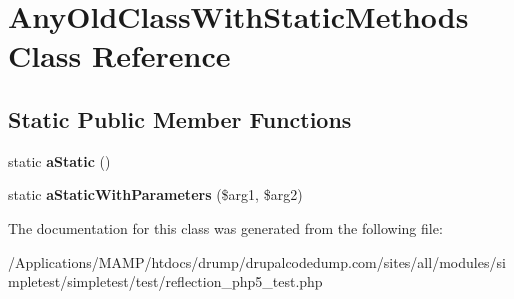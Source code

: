 \hypertarget{class_any_old_class_with_static_methods}{
\section{AnyOldClassWithStaticMethods Class Reference}
\label{class_any_old_class_with_static_methods}
}
\subsection*{Static Public Member Functions}
\begin{DoxyCompactItemize}
\item 
\hypertarget{class_any_old_class_with_static_methods_abeea0e82e5cc85bf5c6577df7d784172}{
static {\bfseries aStatic} ()}
\label{class_any_old_class_with_static_methods_abeea0e82e5cc85bf5c6577df7d784172}

\item 
\hypertarget{class_any_old_class_with_static_methods_a3c0a57bafbe294868d3c6d624f8bd392}{
static {\bfseries aStaticWithParameters} (\$arg1, \$arg2)}
\label{class_any_old_class_with_static_methods_a3c0a57bafbe294868d3c6d624f8bd392}

\end{DoxyCompactItemize}


The documentation for this class was generated from the following file:\begin{DoxyCompactItemize}
\item 
/Applications/MAMP/htdocs/drump/drupalcodedump.com/sites/all/modules/simpletest/simpletest/test/reflection\_\-php5\_\-test.php\end{DoxyCompactItemize}
